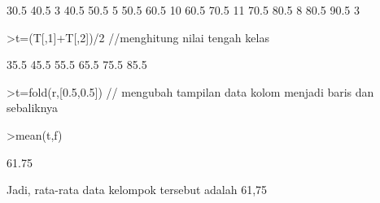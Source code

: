 \documentclass[a4paper,10pt]{article}
\begin{document}
\begin{eulernotebook}
\begin{eulercomment}
\begin{eulercomment}
\begin{eulercomment}
\begin{eulercomment}
\begin{eulercomment}
\begin{eulercomment}
\begin{eulercomment}
\begin{eulercomment}
\begin{eulercomment}
\begin{eulercomment}
\begin{eulercomment}
\begin{eulercomment}
\begin{euleroutput}
         30.5      40.5         3
         40.5      50.5         5
         50.5      60.5        10
         60.5      70.5        11
         70.5      80.5         8
         80.5      90.5         3
\end{euleroutput}
\begin{eulerprompt}
>t=(T[,1]+T[,2])/2  //menghitung nilai tengah kelas
\end{eulerprompt}
\begin{euleroutput}
           35.5 
           45.5 
           55.5 
           65.5 
           75.5 
           85.5 
\end{euleroutput}
\begin{eulerprompt}
>t=fold(r,[0.5,0.5]) // mengubah tampilan data kolom menjadi baris dan sebaliknya
\end{eulerprompt}
\begin{euleroutput}
  [35.5,  45.5,  55.5,  65.5,  75.5,  85.5]
\end{euleroutput}
\begin{eulerprompt}
>mean(t,f)
\end{eulerprompt}
\begin{euleroutput}
  61.75
\end{euleroutput}
\begin{eulercomment}
Jadi, rata-rata data kelompok tersebut adalah 61,75


\end{eulercomment}
\end{eulercomment}
\end{eulercomment}
\end{eulercomment}
\end{eulercomment}
\end{eulercomment}
\end{eulercomment}
\end{eulercomment}
\end{eulercomment}
\end{eulercomment}
\end{eulercomment}
\end{eulercomment}
\end{eulercomment}
\end{eulernotebook}
\end{document}
